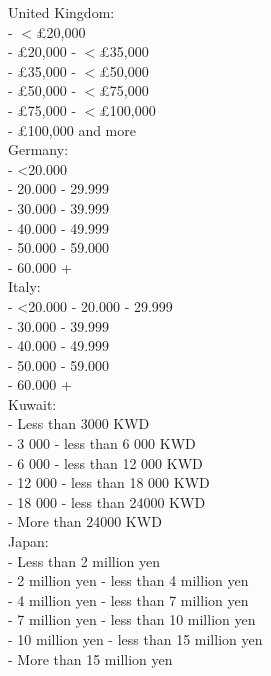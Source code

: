 \documentclass[12pt]{article}
\begin{document}
United Kingdom:\\
 - $<$\pounds20,000\\
 - \pounds20,000 - $<$\pounds35,000\\
 - \pounds35,000 - $<$\pounds50,000\\
 - \pounds50,000 - $<$\pounds75,000\\
 - \pounds75,000 - $<$\pounds100,000\\
 - \pounds100,000 and more\\

Germany:\\
 - <20.000\EUR{}\\
 - 20.000\EUR{} - 29.999\EUR{}\\
 - 30.000\EUR{} - 39.999\EUR{}\\
 - 40.000\EUR{} - 49.999\EUR{}\\
 - 50.000\EUR{} - 59.000\EUR{}\\
 - 60.000\EUR{} +\\

Italy:\\
 - <20.000\EUR{}
 - 20.000\EUR{} - 29.999\EUR{}\\
 - 30.000\EUR{} - 39.999\EUR{}\\
 - 40.000\EUR{} - 49.999\EUR{}\\
 - 50.000\EUR{} - 59.000\EUR{}\\
 - 60.000\EUR{} +\\

Kuwait:\\
 - Less than 3000 KWD\\
 - 3 000 - less than 6 000 KWD\\
 - 6 000 - less than 12 000 KWD\\
 - 12 000 - less than 18 000 KWD\\
 - 18 000 - less than 24000 KWD\\
 - More than 24000 KWD\\

Japan:\\
 - Less than 2 million yen\\
 - 2 million yen - less than 4 million yen\\
 - 4 million yen - less than 7 million yen\\
 - 7 million yen - less than 10 million yen\\
 - 10 million yen - less than 15 million yen\\
 - More than 15 million yen\\
\end{document}
